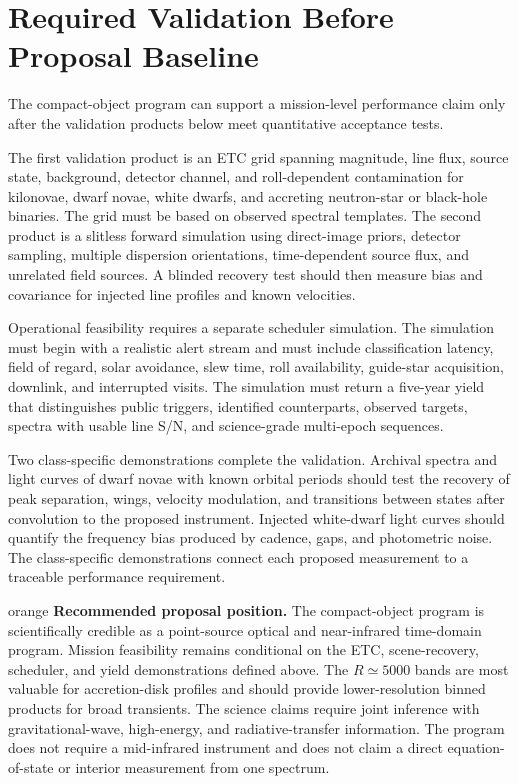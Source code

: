 \documentclass[10pt,onecolumn]{article}
\begin{document}
\section{Required Validation Before Proposal Baseline}

The compact-object program can support a mission-level performance claim only
after the validation products below meet quantitative acceptance tests.

The first validation product is an ETC grid spanning magnitude, line flux,
source state, background, detector channel, and roll-dependent contamination
for kilonovae, dwarf novae, white dwarfs, and accreting neutron-star or
black-hole binaries. The grid must be based on observed spectral templates.
The second product is a slitless forward simulation using direct-image
priors, detector sampling, multiple dispersion orientations, time-dependent
source flux, and unrelated field sources. A blinded recovery test should then
measure bias and covariance for injected line profiles and known velocities.

Operational feasibility requires a separate scheduler simulation. The
simulation must begin with a realistic alert stream and must include
classification latency, field of regard, solar avoidance, slew time, roll
availability, guide-star acquisition, downlink, and interrupted visits. The
simulation must return a five-year yield that distinguishes public triggers,
identified counterparts, observed targets, spectra with usable line S/N, and
science-grade multi-epoch sequences.

Two class-specific demonstrations complete the validation. Archival spectra
and light curves of dwarf novae with known orbital periods should test the
recovery of peak separation, wings, velocity modulation, and transitions
between states
after convolution to the proposed instrument. Injected white-dwarf light
curves should quantify the frequency bias produced by cadence, gaps, and
photometric noise. The class-specific demonstrations connect each proposed
measurement to a traceable performance requirement.

\begin{xresultbox}{orange}
\textbf{Recommended proposal position.}
The compact-object program is scientifically credible as a point-source
optical and near-infrared time-domain program. Mission feasibility remains
conditional on the ETC, scene-recovery, scheduler, and yield demonstrations
defined above. The $R\simeq5000$ bands are most valuable for accretion-disk
profiles and should provide lower-resolution binned products for broad
transients. The science claims require joint inference with gravitational-wave,
high-energy, and radiative-transfer information. The program does not require
a mid-infrared instrument and does not claim a direct equation-of-state or
interior measurement from one spectrum.
\end{xresultbox}
\end{document}
